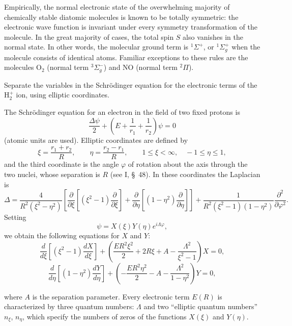 Empirically, the normal electronic state of the overwhelming majority of chemically stable diatomic molecules is known to be totally symmetric: the electronic wave function is invariant under every symmetry transformation of the molecule. In the great majority of cases, the total spin $S$ also vanishes in the normal state. In other words, the molecular ground term is ${}^1\Sigma^+$, or ${}^1\Sigma_g^+$ when the molecule consists of identical atoms. Familiar exceptions to these rules are the molecules $\mathrm O_2$ (normal term ${}^3\Sigma_g^-$) and $\mathrm{NO}$ (normal term ${}^2\Pi$).

\ProblemHeading Separate the variables in the Schrödinger equation for the electronic terms of the $\mathrm H_2^+$ ion, using elliptic coordinates.

\SolutionHeading The Schrödinger equation for an electron in the field of two fixed protons is
\[
 \frac{\Delta\psi}{2}+\left(E+\frac1{r_1}+\frac1{r_2}\right)\psi=0
\]
(atomic units are used). Elliptic coordinates are defined by
\[
 \xi=\frac{r_1+r_2}{R},\qquad \eta=\frac{r_2-r_1}{R},\qquad
 1\leqslant\xi<\infty,\quad -1\leqslant\eta\leqslant1,
\]
and the third coordinate is the angle $\varphi$ of rotation about the axis through the two nuclei, whose separation is $R$ (see I, \S~48). In these coordinates the Laplacian is
\[
 \Delta=\frac4{R^2(\xi^2-\eta^2)}\left[
 \frac{\partial}{\partial\xi}\left[(\xi^2-1)\frac{\partial}{\partial\xi}\right]
 +\frac{\partial}{\partial\eta}\left[(1-\eta^2)\frac{\partial}{\partial\eta}\right]
 \right]+\frac1{R^2(\xi^2-1)(1-\eta^2)}\frac{\partial^2}{\partial\varphi^2}.
\]
Setting
\[
 \psi=X(\xi)Y(\eta)e^{i\Lambda\varphi},
\]
we obtain the following equations for $X$ and $Y$:
\[
 \frac d{d\xi}\left[(\xi^2-1)\frac{dX}{d\xi}\right]
 +\left(\frac{ER^2\xi^2}{2}+2R\xi+A-\frac{\Lambda^2}{\xi^2-1}\right)X=0,
\]
\[
 \frac d{d\eta}\left[(1-\eta^2)\frac{dY}{d\eta}\right]
 +\left(-\frac{ER^2\eta^2}{2}-A-\frac{\Lambda^2}{1-\eta^2}\right)Y=0,
\]

where $A$ is the separation parameter. Every electronic term $E(R)$ is characterized by three quantum numbers: $\Lambda$ and two ``elliptic quantum numbers'' $n_\xi$, $n_\eta$, which specify the numbers of zeros of the functions $X(\xi)$ and $Y(\eta)$.
